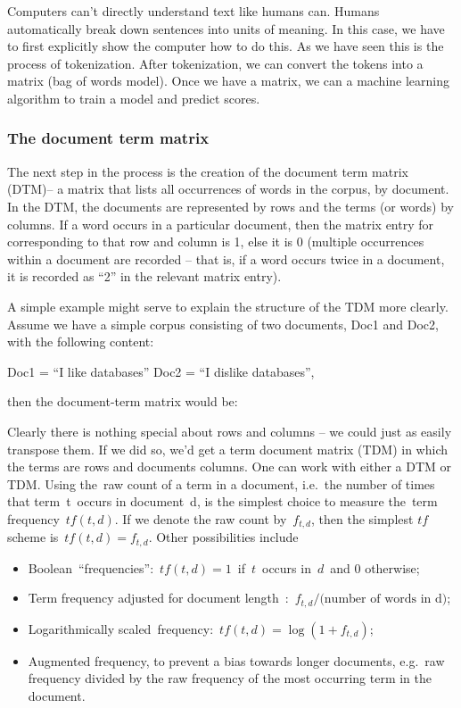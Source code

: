 \documentclass[11pt]{article}
\providecommand{\tightlist}{%
      \setlength{\itemsep}{0pt}\setlength{\parskip}{0pt}}
\begin{document}
    Computers can't directly understand text like humans can. Humans
automatically break down sentences into units of meaning. In this case,
we have to first explicitly show the computer how to do this. As we have
seen this is the process of tokenization. After tokenization, we can
convert the tokens into a matrix (bag of words model). Once we have a
matrix, we can a machine learning algorithm to train a model and predict
scores.

    \hypertarget{the-document-term-matrix}{%
\subsubsection{The document term
matrix}\label{the-document-term-matrix}}

    The next step in the process is the creation of the document term matrix
(DTM)-- a matrix that lists all occurrences of words in the corpus, by
document. In the DTM, the documents are represented by rows and the
terms (or words) by columns. If a word occurs in a particular document,
then the matrix entry for corresponding to that row and column is 1,
else it is 0 (multiple occurrences within a document are recorded --
that is, if a word occurs twice in a document, it is recorded as ``2''
in the relevant matrix entry).

A simple example might serve to explain the structure of the TDM more
clearly. Assume we have a simple corpus consisting of two documents,
Doc1 and Doc2, with the following content:

Doc1 = ``I like databases'' Doc2 = ``I dislike databases'',

then the document-term matrix would be:

Clearly there is nothing special about rows and columns -- we could just
as easily transpose them. If we did so, we'd get a term document matrix
(TDM) in which the terms are rows and documents columns. One can work
with either a DTM or TDM. Using the~raw count of a term in a document,
i.e.~the number of times that term~t~occurs in document~d, is the
simplest choice to measure the~term frequency~\(tf(t,d)\). If we denote
the raw count by~\(f_{t,d}\), then the simplest \(tf\) scheme
is~\(tf(t,d) = f_{t,d}\). Other possibilities include

\begin{itemize}
\tightlist
\item
  Boolean~``frequencies'':~\(tf(t,d) = 1\)~if~\(t\)~occurs in~\(d\)~and
  \(0\) otherwise;
\item
  Term frequency adjusted for document
  length~:~\(f_{t,d} \big/ \text{(number of words in d)}\);
\item
  Logarithmically scaled~frequency:~\(tf(t,d) = \log (1 + f_{t,d})\);
\item
  Augmented frequency, to prevent a bias towards longer documents,
  e.g.~raw frequency divided by the raw frequency of the most occurring
  term in the document.
\end{itemize}
\end{document}
